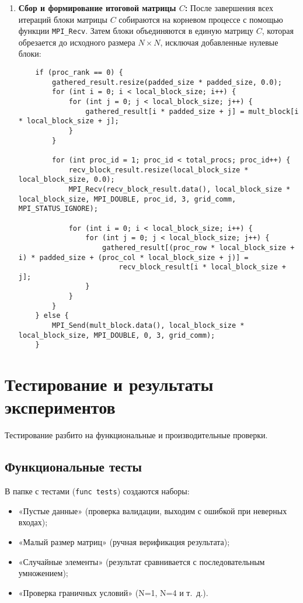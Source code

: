 \documentclass{report}
\begin{document}
\begin{enumerate}
    \item \textbf{Сбор и формирование итоговой матрицы $C$:}  
    После завершения всех итераций блоки матрицы $C$ собираются на корневом процессе с помощью функции \texttt{MPI\_Recv}. Затем блоки объединяются в единую матрицу $C$, которая обрезается до исходного размера $N \times N$, исключая добавленные нулевые блоки:
    \begin{lstlisting}
    if (proc_rank == 0) {
        gathered_result.resize(padded_size * padded_size, 0.0);
        for (int i = 0; i < local_block_size; i++) {
            for (int j = 0; j < local_block_size; j++) {
                gathered_result[i * padded_size + j] = mult_block[i * local_block_size + j];
            }
        }

        for (int proc_id = 1; proc_id < total_procs; proc_id++) {
            recv_block_result.resize(local_block_size * local_block_size, 0.0);
            MPI_Recv(recv_block_result.data(), local_block_size * local_block_size, MPI_DOUBLE, proc_id, 3, grid_comm, MPI_STATUS_IGNORE);

            for (int i = 0; i < local_block_size; i++) {
                for (int j = 0; j < local_block_size; j++) {
                    gathered_result[(proc_row * local_block_size + i) * padded_size + (proc_col * local_block_size + j)] =
                        recv_block_result[i * local_block_size + j];
                }
            }
        }
    } else {
        MPI_Send(mult_block.data(), local_block_size * local_block_size, MPI_DOUBLE, 0, 3, grid_comm);
    }
    \end{lstlisting}
\end{enumerate}

\newpage

\section*{Тестирование и результаты экспериментов}

Тестирование разбито на функциональные и производительные проверки.

\subsection*{Функциональные тесты}

В папке с тестами (\texttt{func tests}) создаются наборы:

\begin{itemize}
    \item «Пустые данные» (проверка валидации, выходим с ошибкой при неверных входах);
    \item «Малый размер матриц» (ручная верификация результата);
    \item «Случайные элементы» (результат сравнивается с последовательным умножением);
    \item «Проверка граничных условий» (N=1, N=4 и т.~д.).
\end{itemize}
\end{document}
